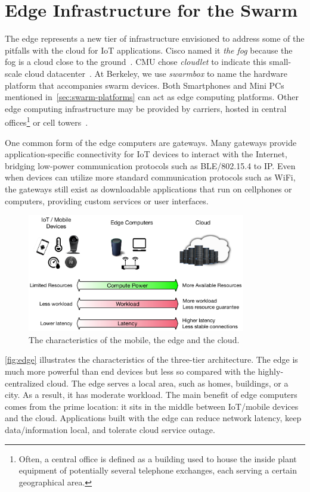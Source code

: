 \section{Edge Infrastructure for the Swarm}
\label{sec:edge-computing}

The edge represents a new tier of infrastructure envisioned to address some of
the pitfalls with the cloud for IoT applications. Cisco named it \textit{the
  fog} because the fog is a cloud close to the ground~\cite{bonomi2012fog}. CMU
chose \textit{cloudlet} to indicate this small-scale cloud
datacenter~\cite{ha2014towards, satyanarayanan2009case}. At Berkeley, we use
\textit{swarmbox} to name the hardware platform that accompanies swarm
devices. Both Smartphones and Mini PCs mentioned
in~\autoref{sec:swarm-platforms} can act as edge computing platforms. Other edge
computing infrastructure may be provided by carriers, hosted in central
offices\footnote{Often, a central office is defined as a building used to house
  the inside plant equipment of potentially several telephone exchanges, each
  serving a certain geographical area.} or cell towers~\cite{att2017edge}.

One common form of the edge computers are gateways. Many gateways provide
application-specific connectivity for IoT devices to interact with the Internet,
bridging low-power communication protocols such as BLE/802.15.4 to IP. Even when
devices can utilize more standard communication protocols such as WiFi, the
gateways still exist as downloadable applications that run on cellphones or
computers, providing custom services or user interfaces.

\begin{figure}
  \centering
  \includegraphics[width=0.85\textwidth]{figures/background.pdf}
  \caption{The characteristics of the mobile, the edge and the cloud.}
  \label{fig:edge}
\end{figure}

\autoref{fig:edge} illustrates the characteristics of the three-tier
architecture. The edge is much more powerful than end devices but less so
compared with the highly-centralized cloud. The edge serves a local area, such
as homes, buildings, or a city. As a result, it has moderate workload. The main
benefit of edge computers comes from the prime location: it sits in the middle
between IoT/mobile devices and the cloud. Applications built with the edge can
reduce network latency, keep data/information local, and tolerate cloud service
outage.

